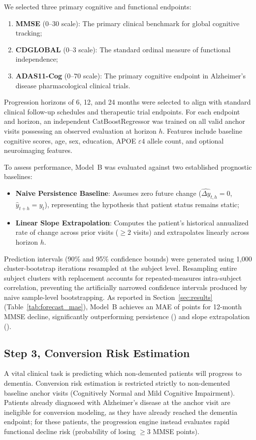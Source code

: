We selected three primary cognitive and functional endpoints:
\begin{enumerate}
    \item \textbf{MMSE} ($0$--$30$ scale): The primary clinical benchmark for global cognitive tracking;
    \item \textbf{CDGLOBAL} ($0$--$3$ scale): The standard ordinal measure of functional independence;
    \item \textbf{ADAS11-Cog} ($0$--$70$ scale): The primary cognitive endpoint in Alzheimer's disease pharmacological clinical trials.
\end{enumerate}
Progression horizons of 6, 12, and 24 months were selected to align with standard clinical follow-up schedules and therapeutic trial endpoints. For each endpoint and horizon, an independent CatBoostRegressor was trained on all valid anchor visits possessing an observed evaluation at horizon $h$. Features include baseline cognitive scores, age, sex, education, APOE $\varepsilon4$ allele count, and optional neuroimaging features.

To assess performance, Model~B was evaluated against two established prognostic baselines:
\begin{itemize}
    \item \textbf{Naive Persistence Baseline}: Assumes zero future change ($\widehat{\Delta y}_{t, h} = 0$, $\hat{y}_{t+h} = y_t$), representing the hypothesis that patient status remains static;
    \item \textbf{Linear Slope Extrapolation}: Computes the patient's historical annualized rate of change across prior visits ($\ge 2$ visits) and extrapolates linearly across horizon $h$.
\end{itemize}

Prediction intervals (90\% and 95\% confidence bounds) were generated using 1,000 cluster-bootstrap iterations resampled at the subject level. Resampling entire subject clusters with replacement accounts for repeated-measures intra-subject correlation, preventing the artificially narrowed confidence intervals produced by naive sample-level bootstrapping. As reported in Section~\ref{sec:results} (Table~\ref{tab:forecast_mae}), Model~B achieves an MAE of \MMSEMAEXII{} points for 12-month MMSE decline, significantly outperforming persistence (\MMSEPersistXII{}) and slope extrapolation (\MMSESlopeXII{}).

\subsection{Step 3, Conversion Risk Estimation}
A vital clinical task is predicting which non-demented patients will progress to dementia. Conversion risk estimation is restricted strictly to non-demented baseline anchor visits (Cognitively Normal and Mild Cognitive Impairment). Patients already diagnosed with Alzheimer's disease at the anchor visit are ineligible for conversion modeling, as they have already reached the dementia endpoint; for these patients, the progression engine instead evaluates rapid functional decline risk (probability of losing $\ge 3$ MMSE points).

